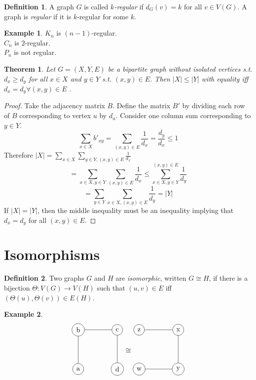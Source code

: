 \documentclass{article}
\newtheorem*{thm}{Theorem}
\theoremstyle{definition}
\newtheorem*{defn}{Definition}
\newtheorem*{ex}{Example}
\begin{document}
\begin{defn}
A graph $G$ is called \emph{$k$-regular} if $d_G(v) = k$ for all $v\in V(G)$.
A graph is \emph{regular} if it is $k$-regular for some $k$.
\end{defn}

\begin{ex}
$K_n$ is $(n-1)$-regular. \\
$C_n$ is $2$-regular. \\
$P_n$ is not regular. \\
\end{ex}


\begin{thm}
Let $G=(X,Y,E)$ be a bipartite graph without isolated vertices s.t. $d_x\geq d_y$ for all $x\in X$ and $y\in Y$ s.t. $(x,y)\in E$.
Then $|X| \leq |Y|$ with equality iff $d_x = d_y \forall (x,y)\in E$ .
\end{thm}

\begin{proof}
Take the adjacency matrix $B$.
Define the matrix $B'$ by dividing each row of $B$ corresponding to vertex $u$ by $d_u$.
Consider one column sum corresponding to $y\in Y$.
$$\sum_{x\in X} b'_{xy} = \sum_{(x,y)\in E} \frac{1}{d_x} = \frac{d_y}{d_x} \leq 1$$
Therefore $|X|=\sum_{x\in X}\sum_{y\in Y,(x,y)\in E} \frac{1}{d_x}$
$$=\sum_{x\in X, y\in Y}\sum_{(x,y)\in E} \frac{1}{d_x} \leq \sum_{x\in X, y\in Y}^{(x,y)\in E} \frac{1}{d_y}$$
$$=\sum_{y\in Y} \sum_{x\in X,(x,y)\in E} \frac{1}{d_y} = |Y|$$
If $|X|=|Y|$, then the middle inequality must be an inequality implying that $d_x=d_y$ for all $(x,y)\in E$.
\end{proof}

\section{Isomorphisms}

\begin{defn}
Two graphs $G$ and $H$ are \emph{isomorphic}, written $G\cong H$, if there is a bijection $\Theta\colon V(G) \to V(H)$ such that $(u,v)\in E$ iff $(\Theta(u),\Theta(v))\in E(H)$.
\end{defn}

\begin{ex}
$$
\begin{tikzpicture}[baseline=5.5ex]
  \node[draw,circle] (G-1) at (0,0) {a};
  \node[draw,circle] (G-2) at (0,2) {b};
  \node[draw,circle] (G-3) at (2,2) {c};
  \node[draw,circle] (G-4) at (2,0) {d};
  \draw (G-1) -- (G-2) -- (G-3) -- (G-4);
\end{tikzpicture}\cong
\begin{tikzpicture}[baseline=5.5ex]
  \node[draw,circle] (G-1) at (0,0) {w};
  \node[draw,circle] (G-2) at (0,2) {z};
  \node[draw,circle] (G-3) at (2,2) {x};
  \node[draw,circle] (G-4) at (2,0) {y};
  \draw (G-1) -- (G-4) -- (G-3) -- (G-2);
\end{tikzpicture}$$
\end{ex}
\end{document}
